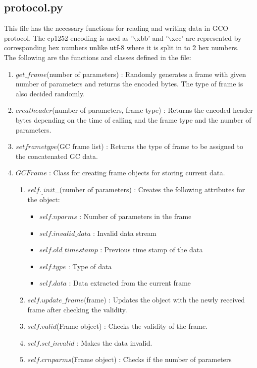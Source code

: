 \subsection{protocol.py}
This file has the necessary functions for reading and writing data in GCO
protocol. The cp1252 encoding is used as '$\backslash$xbb' and
'$\backslash$xcc' are represented by corresponding hex numbers unlike utf-8
where it is split in to 2 hex numbers.\\
The following are the functions and classes defined in the file:
\begin{enumerate}
	\item $get\_frame$(number of parameters) : Randomly generates a
		frame with given number of parameters and returns the encoded bytes.
		The type of frame is also decided randomly.
	\item $creatheader$(number of parameters, frame type) : Returns
		the encoded header bytes depending on the time of calling and the frame
		type and the number of parameters.
	\item $setframetype$(GC frame list) : Returns the type of frame to be
		assigned to the concatenated GC data.
	\item $GCFrame$ : Class for creating frame objects for storing current
		data.
		\begin{enumerate}
			\item $self._\_init\_\_$(number of parameters) : Creates the following
				attributes for the object:
				\begin{itemize}
					\item $self.nparms$ : Number of parameters in the frame
					\item $self.invalid\_data$ : Invalid data stream
					\item $self.old\_timestamp$ : Previous time stamp of the
						data
					\item $self.type$ : Type of data
					\item $self.data$ : Data extracted from the current frame
				\end{itemize}
			\item $self.update\_frame$(frame) : Updates the object with the newly
				received frame after checking the validity.
			\item $self.valid$(Frame object) : Checks the validity of the frame.
			\item $self.set\_invalid$ : Makes the data invalid.
			\item $self.crnparms$(Frame object) : Checks if the number of parameters

\end{enumerate}
\end{enumerate}
